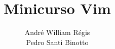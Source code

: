 \documentclass{beamer}
\title{Minicurso Vim}
\author{André William Régis \\ Pedro Santi Binotto}
\institute{UFSC}
\date{\the\year}
\begin{document}
\frame{\titlepage}










\end{document}
